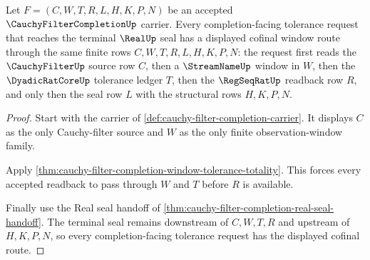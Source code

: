 \begin{theorem}
\label{thm:cauchy-filter-completion-window-cofinality}
Let $F=(C,W,T,R,L,H,K,P,N)$ be an accepted $\CauchyFilterCompletionUp$ carrier. Every completion-facing tolerance request that reaches the terminal $\RealUp$ seal has a displayed cofinal window route through the same finite rows $C,W,T,R,L,H,K,P,N$: the request first reads the $\CauchyFilterUp$ source row $C$, then a $\StreamNameUp$ window in $W$, then the $\DyadicRatCoreUp$ tolerance ledger $T$, then the $\RegSeqRatUp$ readback row $R$, and only then the seal row $L$ with the structural rows $H,K,P,N$.
\end{theorem}
\begin{proof}
Start with the carrier of \autoref{def:cauchy-filter-completion-carrier}. It displays $C$ as the only Cauchy-filter source and $W$ as the only finite observation-window family.

Apply \autoref{thm:cauchy-filter-completion-window-tolerance-totality}. This forces every accepted readback to pass through $W$ and $T$ before $R$ is available.

Finally use the Real seal handoff of \autoref{thm:cauchy-filter-completion-real-seal-handoff}. The terminal seal remains downstream of $C,W,T,R$ and upstream of $H,K,P,N$, so every completion-facing tolerance request has the displayed cofinal route.
\end{proof}

